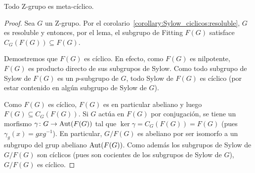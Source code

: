 \begin{theorem}
	\label{theorem:Z=>metacyclic}
	Todo Z-grupo es meta-cíclico.
\end{theorem}

\begin{proof}
	Sea $G$ un Z-grupo.	Por el
	corolario~\ref{corollary:Sylow_ciclicos:resoluble}, $G$ es resoluble y
	entonces, por el lema, el subgrupo de Fitting $F(G)$ satisface
	$C_G(F(G))\subseteq F(G)$. 
	
	Demostremos que $F(G)$ es cíclico. En efecto, como $F(G)$ es nilpotente,
	$F(G)$ es producto directo de sus subgrupos de Sylow. Como todo subgrupo de
	Sylow de $F(G)$ es un $p$-subgrupo de $G$, todo Sylow de $F(G)$ es cíclico
	(por estar contenido en algún subgrupo de Sylow de $G$). 

	Como $F(G)$ es cíclico, $F(G)$ es en particular abeliano y luego
	$F(G)\subseteq C_G(F(G))$. Si $G$ actúa en $F(G)$ por conjugación, se tiene
	un morfismo $\gamma\colon G\to\operatorname{Aut}(F(G))$ tal que
	$\ker\gamma=C_G(F(G))=F(G)$ (pues $\gamma_g(x)=gxg^{-1}$). En particular,
	$G/F(G)$ es abeliano por ser isomorfo a un subgrupo del grup abeliano
	$\operatorname{Aut}(F(G))$. Como además los subgrupos de Sylow de $G/F(G)$ son cíclicos (pues
	son cocientes de los subgrupos de Sylow de $G$), $G/F(G)$ es cíclico.
\end{proof}

